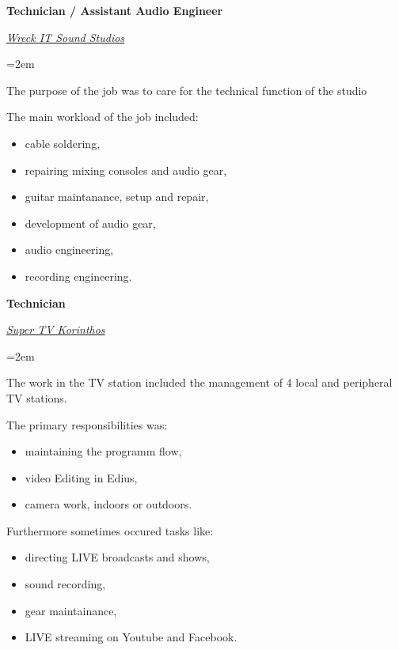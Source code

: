 \documentclass{article}
\newcommand{\sepspace}{\vspace*{1em}}
\newcommand{\work}[4]{
	\noindent \textbf{#1} %
	\hfill
	\framebox{	%
		\parbox{6em}{
			\centering{#2}}} \par
	\noindent\textit{#3} \par	%
	\vspace*{0.5em}
	\noindent\hangindent=2em\hangafter=0 \small #4	%
	\normalsize \par
}
\begin{document}
	\work{Technician / Assistant Audio Engineer}{2017--}{\href{https://www.wreckitsoundstudios.com/}{Wreck IT Sound Studios}}{
		\begin{center}
			The purpose of the job was to care for the technical function of the studio
		\end{center}
		\begin{multicols}{2}
			The main workload of the job included:
			\begin{itemize}[noitemsep]
				\item cable soldering,
				\item repairing mixing consoles and audio gear,
				\item guitar maintanance, setup and repair,
				\item development of audio gear,
				\item audio engineering,
				\item recording engineering.
			\end{itemize}
		\end{multicols}
	}
	\sepspace

	\work{Technician}{2015--2019}{\href{https://supertvkorinthos.gr/}{Super TV Korinthos}}{
		\begin{center}
			The work in the TV station included the management of 4 local and peripheral TV stations.
		\end{center}
		\begin{multicols}{2}
			The primary responsibilities was:
			\begin{itemize}[noitemsep]
				\item maintaining the programm flow,
				\item video Editing in Edius,
				\item camera work, indoors or outdoors.
			\end{itemize}
		\columnbreak

		Furthermore sometimes occured tasks like:
		\begin{itemize}[noitemsep]
			\item directing LIVE broadcasts and shows,
			\item sound recording,
			\item gear maintainance,
			\item LIVE streaming on Youtube and Facebook.
		\end{itemize}
		\end{multicols}
	}

	\pagebreak
\end{document}
